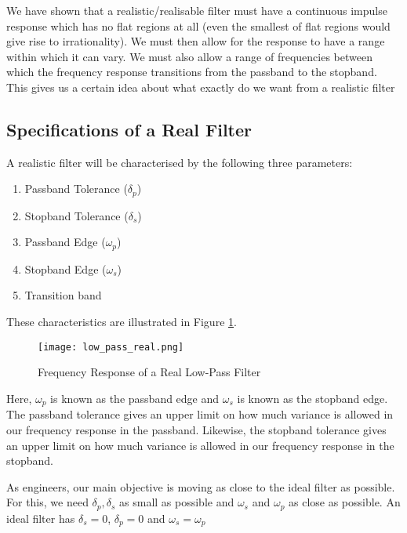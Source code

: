 \documentclass{article}
\theoremstyle{definition}
\begin{document}
We have shown that a realistic/realisable filter must have a continuous impulse response which has no flat regions at all (even the smallest of flat regions would give rise to irrationality). We must then allow for the response to have a range within which it can vary. We must also allow a range of frequencies between which the frequency response transitions from the passband to the stopband. This gives us a certain idea about what exactly do we want from a realistic filter

\subsection{Specifications of a Real Filter}

A realistic filter will be characterised by the following three parameters:

\begin{enumerate}
    \item Passband Tolerance ($\delta_p$)
    \item Stopband Tolerance ($\delta_s$)
    \item Passband Edge ($\omega_p$)
    \item Stopband Edge ($\omega_s$)
    \item Transition band 
\end{enumerate}

These characteristics are illustrated in Figure \ref{fig:low_pass_real}. \medskip

\begin{figure}[h!]
\centering
\texttt{[image: low\_pass\_real.png]}
\caption{Frequency Response of a Real Low-Pass Filter}
\label{fig:low_pass_real}
\end{figure}	 

Here, $\omega_p$ is known as the passband edge and $\omega_s$ is known as the stopband edge. The passband tolerance gives an upper limit on how much variance is allowed in our frequency response in the passband. Likewise, the stopband tolerance gives an upper limit on how much variance is allowed in our frequency response in the stopband. \smallskip

As engineers, our main objective is moving as close to the ideal filter as possible. For this, we need $\delta_p, \delta_s$ as small as possible and $\omega_s$ and $\omega_p$ as close as possible. An ideal filter has $\delta_s = 0$, $\delta_p = 0$ and $\omega_s = \omega_p$ \medskip
\end{document}

